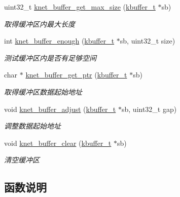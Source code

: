 \begin{DoxyCompactItemize}
uint32\+\_\+t \hyperlink{a00047_a8eee118becbc822b85b0459ece43b944_a8eee118becbc822b85b0459ece43b944}{knet\+\_\+buffer\+\_\+get\+\_\+max\+\_\+size} (\hyperlink{a00053_a4b09a7574cd440f9b94285ab73c81b4e_a4b09a7574cd440f9b94285ab73c81b4e}{kbuffer\+\_\+t} $\ast$sb)
\begin{DoxyCompactList}\small\item\em 取得缓冲区内最大长度 \end{DoxyCompactList}\item 
int \hyperlink{a00047_ab52a4b25cb665848167e2e3a57ad38f4_ab52a4b25cb665848167e2e3a57ad38f4}{knet\+\_\+buffer\+\_\+enough} (\hyperlink{a00053_a4b09a7574cd440f9b94285ab73c81b4e_a4b09a7574cd440f9b94285ab73c81b4e}{kbuffer\+\_\+t} $\ast$sb, uint32\+\_\+t size)
\begin{DoxyCompactList}\small\item\em 测试缓冲区内是否有足够空间 \end{DoxyCompactList}\item 
char $\ast$ \hyperlink{a00047_aad25b6a27ca6270b4cffb9c45daea697_aad25b6a27ca6270b4cffb9c45daea697}{knet\+\_\+buffer\+\_\+get\+\_\+ptr} (\hyperlink{a00053_a4b09a7574cd440f9b94285ab73c81b4e_a4b09a7574cd440f9b94285ab73c81b4e}{kbuffer\+\_\+t} $\ast$sb)
\begin{DoxyCompactList}\small\item\em 取得缓冲区数据起始地址 \end{DoxyCompactList}\item 
void \hyperlink{a00047_ace8a684108f818eab5d956235b0bce77_ace8a684108f818eab5d956235b0bce77}{knet\+\_\+buffer\+\_\+adjust} (\hyperlink{a00053_a4b09a7574cd440f9b94285ab73c81b4e_a4b09a7574cd440f9b94285ab73c81b4e}{kbuffer\+\_\+t} $\ast$sb, uint32\+\_\+t gap)
\begin{DoxyCompactList}\small\item\em 调整数据起始地址 \end{DoxyCompactList}\item 
void \hyperlink{a00047_ac787e1b4f944728f621d7f59b67eb0aa_ac787e1b4f944728f621d7f59b67eb0aa}{knet\+\_\+buffer\+\_\+clear} (\hyperlink{a00053_a4b09a7574cd440f9b94285ab73c81b4e_a4b09a7574cd440f9b94285ab73c81b4e}{kbuffer\+\_\+t} $\ast$sb)
\begin{DoxyCompactList}\small\item\em 清空缓冲区 \end{DoxyCompactList}\end{DoxyCompactItemize}


\subsection{函数说明}
\hypertarget{a00047_ace8a684108f818eab5d956235b0bce77_ace8a684108f818eab5d956235b0bce77}{}
